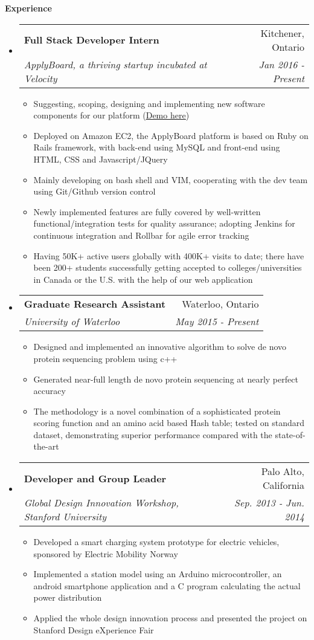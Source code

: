 \documentclass[letterpaper,10pt]{article}
\makeatletter
\newcommand{\resitem}[1]{\item #1 \vspace{-2pt}}
\newcommand{\resheading}[1]{{\large \colorbox{mygrey}{\begin{minipage}{\textwidth}{\textbf{#1 \vphantom{p\^{E}}}}\end{minipage}}}}
\newcommand{\ressubheading}[4]{
\begin{tabular*}{7.0in}{l@{\extracolsep{\fill}}r}
		\textbf{#1} & #2 \\
		\textit{#3} & \textit{#4} \\
\end{tabular*}\vspace{-6pt}}
\makeatother
\begin{document}
\resheading{Experience}
\begin{itemize}
\itemsep0em
\item 
    \ressubheading{Full Stack Developer Intern}{Kitchener, Ontario}{ApplyBoard, a thriving startup incubated at Velocity}{Jan 2016 - Present}
	\begin{itemize}
        \resitem{Suggesting, scoping, designing and implementing new software components for our platform (\href{https://www.applyboard.com/demo}{\underline{Demo here}})}
        \resitem{Deployed on Amazon EC2, the ApplyBoard platform is based on Ruby on Rails framework, with back-end using MySQL and front-end using HTML, CSS and Javascript/JQuery}
        \resitem{Mainly developing on bash shell and VIM, cooperating with the dev team using Git/Github version control}
		\resitem{Newly implemented features are fully covered by well-written functional/integration tests for quality assurance; adopting Jenkins for continuous integration and Rollbar for agile error tracking}
        \resitem{Having 50K+ active users globally with 400K+ visits to date; there have been 200+ students successfully getting accepted to colleges/universities in Canada or the U.S. with the help of our web application }
	\end{itemize}

\item
	\ressubheading{Graduate Research Assistant}{Waterloo, Ontario}{University of Waterloo}{May 2015 - Present}
	\begin{itemize}
		\resitem{Designed and implemented an innovative algorithm to solve de novo protein sequencing problem using c++}
		\resitem{Generated near-full length de novo protein sequencing at nearly perfect accuracy}
		\resitem{The methodology is a novel combination of a sophisticated protein scoring function and an amino acid based Hash table; tested on standard dataset, demonstrating superior performance compared with the state-of-the-art}
	\end{itemize}
\item
	\ressubheading{Developer and Group Leader}{Palo Alto, California}{Global Design Innovation Workshop, Stanford University}{ Sep. 2013 - Jun. 2014}
	\begin{itemize}
		\resitem{Developed a smart charging system prototype for electric vehicles, sponsored by Electric Mobility Norway}
        \resitem{Implemented a station model using an Arduino microcontroller, an android smartphone application and a C program calculating the actual power distribution}
		\resitem{Applied the whole design innovation process and presented the project on Stanford Design eXperience Fair}
	\end{itemize}
\end{itemize}
\end{document}
